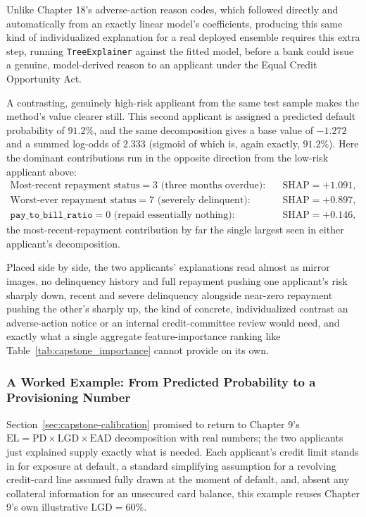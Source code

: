 \documentclass[../ai_in_finance]{subfiles}
\begin{document}
Unlike Chapter 18's adverse-action reason codes, which followed directly and automatically from an exactly linear model's coefficients, producing this same kind of individualized explanation for a real deployed ensemble requires this extra step, running \texttt{TreeExplainer} against the fitted model, before a bank could issue a genuine, model-derived reason to an applicant under the Equal Credit Opportunity Act.

A contrasting, genuinely high-risk applicant from the same test sample makes the method's value clearer still. This second applicant is assigned a predicted default probability of $91.2\%$, and the same decomposition gives a base value of $-1.272$ and a summed log-odds of $2.333$ (sigmoid of which is, again exactly, $91.2\%$). Here the dominant contributions run in the opposite direction from the low-risk applicant above:
\begin{align*}
\text{Most-recent repayment status} = 3 \text{ (three months overdue):} &\quad \text{SHAP} = +1.091, \\
\text{Worst-ever repayment status} = 7 \text{ (severely delinquent):} &\quad \text{SHAP} = +0.897, \\
\texttt{pay\_to\_bill\_ratio} = 0 \text{ (repaid essentially nothing):} &\quad \text{SHAP} = +0.146,
\end{align*}
the most-recent-repayment contribution by far the single largest seen in either applicant's decomposition.

Placed side by side, the two applicants' explanations read almost as mirror images, no delinquency history and full repayment pushing one applicant's risk sharply down, recent and severe delinquency alongside near-zero repayment pushing the other's sharply up, the kind of concrete, individualized contrast an adverse-action notice or an internal credit-committee review would need, and exactly what a single aggregate feature-importance ranking like Table~\ref{tab:capstone_importance} cannot provide on its own.

\subsubsection*{A Worked Example: From Predicted Probability to a Provisioning Number}

Section~\ref{sec:capstone-calibration} promised to return to Chapter 9's $\text{EL} = \text{PD} \times \text{LGD} \times \text{EAD}$ decomposition with real numbers; the two applicants just explained supply exactly what is needed. Each applicant's credit limit stands in for exposure at default, a standard simplifying assumption for a revolving credit-card line assumed fully drawn at the moment of default, and, absent any collateral information for an unsecured card balance, this example reuses Chapter 9's own illustrative $\text{LGD}=60\%$.
\end{document}
